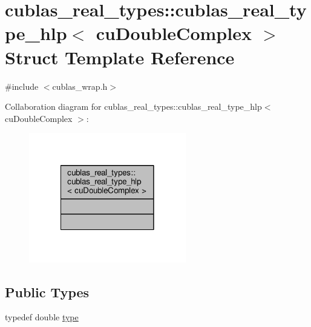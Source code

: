 \hypertarget{structcublas__real__types_1_1cublas__real__type__hlp_3_01cuDoubleComplex_01_4}{\section{cublas\-\_\-real\-\_\-types\-:\-:cublas\-\_\-real\-\_\-type\-\_\-hlp$<$ cu\-Double\-Complex $>$ Struct Template Reference}
\label{structcublas__real__types_1_1cublas__real__type__hlp_3_01cuDoubleComplex_01_4}
}


{\ttfamily \#include $<$cublas\-\_\-wrap.\-h$>$}



Collaboration diagram for cublas\-\_\-real\-\_\-types\-:\-:cublas\-\_\-real\-\_\-type\-\_\-hlp$<$ cu\-Double\-Complex $>$\-:
\nopagebreak
\begin{figure}[H]
\begin{center}
\leavevmode
\includegraphics[width=194pt]{structcublas__real__types_1_1cublas__real__type__hlp_3_01cuDoubleComplex_01_4__coll__graph}
\end{center}
\end{figure}
\subsection*{Public Types}
\begin{DoxyCompactItemize}
\item 
typedef double \hyperlink{structcublas__real__types_1_1cublas__real__type__hlp_3_01cuDoubleComplex_01_4_a551952c60dae7ba15565b979aa908d31}{type}
\end{DoxyCompactItemize}



